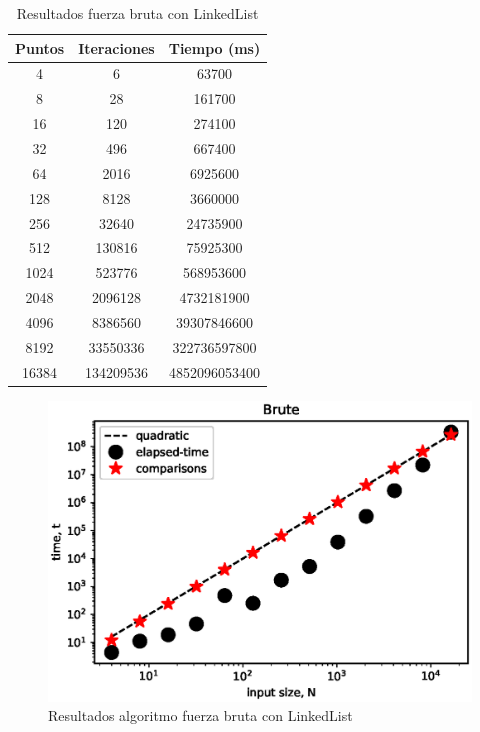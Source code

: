 \FloatBarrier
\begin{table}[h!]
    \centering
    \begin{tabular}{|c|c|c|}
    \hline
    Puntos & Iteraciones & Tiempo (ms)\\
    \hline
    4 & 6 & 63700\\
    \hline
    8 & 28 & 161700\\
    \hline
    16 & 120 & 274100\\
    \hline
    32 & 496 & 667400\\
    \hline
    64 & 2016 & 6925600\\
    \hline
    128 & 8128 & 3660000\\
    \hline
    256 & 32640 & 24735900\\
    \hline
    512 & 130816 & 75925300\\
    \hline
    1024 & 523776 & 568953600\\
    \hline
    2048 & 2096128 & 4732181900\\
    \hline
    4096 & 8386560 & 39307846600\\
    \hline
    8192 & 33550336 & 322736597800\\
    \hline
    16384 & 134209536 & 4852096053400\\
    \hline
    \end{tabular}
    \caption{Resultados fuerza bruta con LinkedList}
     \label{tab:bruteLT}
\end{table}
\begin{figure}[h!]
    \centering
    \includegraphics[scale=0.8, center]{images/bruteLinkedList.eps}
    \caption{Resultados algoritmo fuerza bruta con LinkedList}
    \label{fig:bruteLG}
\end{figure}

